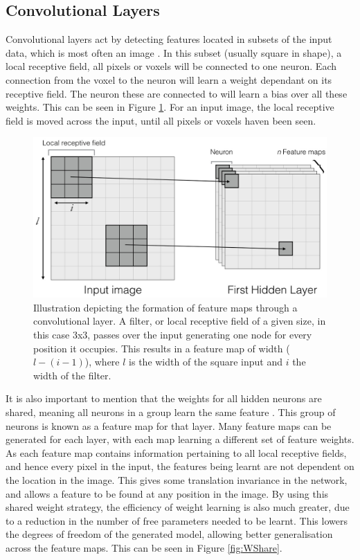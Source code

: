 \documentclass[11pt,a4paper]{memoir}
\numberwithin{figure}{section}
\numberwithin{table}{section}
\numberwithin{equation}{section}
\begin{document}
\subsection{Convolutional Layers}

Convolutional layers act by detecting features located in subsets of the input data, which is most often an image \cite{Lecun1998Gradient-basedRecognition}. In this subset (usually square in shape), a local receptive field, all pixels or voxels will be connected to one neuron. Each connection from the voxel to the neuron will learn a weight dependant on its receptive field. The neuron these are connected to will learn a bias over all these weights. This can be seen in Figure \ref{fig:CNN}. For an input image, the local receptive field is moved across the input, until all pixels or voxels haven been seen. \\

\begin{figure}[!h]
\centering
\includegraphics[width=1\textwidth]{CNN.jpg}
\caption[Illustration of feature map generation in a convolutional layer]{Illustration depicting the formation of feature maps through a convolutional layer. A filter, or local receptive field of a given size, in this case 3x3, passes over the input generating one node for every position it occupies. This results in a feature map of width ($l - (i-1)$), where $l$ is the width of the square input and $i$ the width of the filter.}
\label{fig:CNN}
\end{figure}

It is also important to mention that the weights for all hidden neurons are shared, meaning all neurons in a group learn the same feature \cite{RanzatoMarcAurelio2007UnsupervisedRecognition}. This group of neurons is known as a feature map for that layer. Many feature maps can be generated for each layer, with each map learning a different set of feature weights. As each feature map contains information pertaining to all local receptive fields, and hence every pixel in the input, the features being learnt are not dependent on the location in the image. This gives some translation invariance in the network, and allows a feature to be found at any position in the image. By using this shared weight strategy, the efficiency of weight learning is also much greater, due to a reduction in the number of free parameters needed to be learnt. This lowers the degrees of freedom of the generated model, allowing better generalisation across the feature maps. This can be seen in Figure \ref{fig:WShare}. \\
\end{document}
